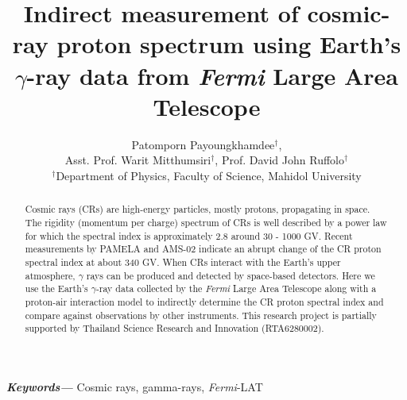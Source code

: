 \documentclass[a4paper, 12pt]{article}
\title{
  Indirect measurement of cosmic-ray proton spectrum
  using Earth's $\gamma$-ray data from {\it Fermi}
  Large Area Telescope
}
\author{
  Patomporn Payoungkhamdee$^{\dagger}$,\\
  Asst. Prof. Warit Mitthumsiri$^{\dagger}$, Prof. David John Ruffolo$^{\dagger}$\\
  \small $^{\dagger}$Department of Physics, Faculty of Science, Mahidol University
}
\date{} %
\providecommand{\keywords}[1]
{
  \small	
  \textbf{\textit{Keywords---}} #1
}
\begin{document}
\maketitle

\begin{abstract}
\normalsize

Cosmic rays (CRs) are high-energy particles, mostly protons, propagating in space. The rigidity (momentum per charge) spectrum of CRs is well described by a power law for which the spectral index is approximately 2.8 around 30 - 1000 GV. Recent measurements by PAMELA and AMS-02 indicate an abrupt change of the CR proton spectral index at about 340 GV. When CRs interact with the Earth's upper atmosphere, $\gamma$ rays can be produced and detected by space-based detectors. Here we use the Earth's $\gamma$-ray data collected by the {\it Fermi} Large Area Telescope along with a proton-air interaction model to indirectly determine the CR proton spectral index and compare against observations by other instruments.
This research project is partially supported by Thailand Science Research and Innovation (RTA6280002).

\end{abstract}
\hspace{10pt}

\keywords{ Cosmic rays, gamma-rays, {\it Fermi}-LAT}



\end{document}
